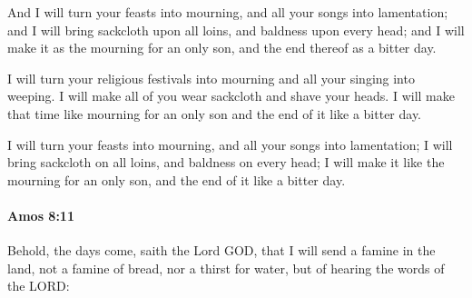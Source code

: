 			\begin{versebox}
					\item[BHS] 
					\item[LXX] 
					\item[ASV] And I will turn your feasts into mourning, and all your songs into lamentation; and I will bring sackcloth upon all loins, and baldness upon every head; and I will make it as the mourning for an only son, and the end thereof as a bitter day.
					\item[NIV] I will turn your religious festivals into mourning and all your singing into weeping. I will make all of you wear sackcloth and shave your heads. I will make that time like mourning for an only son and the end of it like a bitter day.
					\item[NRSV] I will turn your feasts into mourning, and all your songs into lamentation; I will bring sackcloth on all loins, and baldness on every head; I will make it like the mourning for an only son, and the end of it like a bitter day.
			\end{versebox}

		\paragraph{Amos 8:11} %
			\label{AMOS-8-11}

			Behold, the days come, saith the Lord GOD, that I will send a famine in the land, not a famine of bread, nor a thirst for water, but of hearing the words of the LORD:

